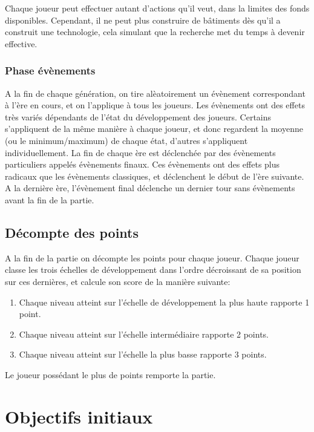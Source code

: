\documentclass[12pt,twoside,a4paper]{article}
\begin{document}
Chaque joueur peut effectuer autant d'actions qu'il veut, dans la limites des fonds disponibles. Cependant, il ne peut plus construire de b\^atiments d\`es qu'il a construit une technologie, cela simulant que la recherche met du temps \`a devenir effective.

\subsubsection{Phase \'ev\`enements}

A la fin de chaque g\'en\'eration, on tire al\`eatoirement un \'ev\`enement correspondant \`a l'\`ere en cours, et on l'applique \`a tous les joueurs. Les \'ev\`enements ont des effets tr\`es vari\'es d\'ependants de l'\'etat du d\'eveloppement des joueurs. Certains s'appliquent de la m\^eme mani\`ere \`a chaque joueur, et donc regardent la moyenne (ou le minimum/maximum) de chaque \'etat, d'autres s'appliquent individuellement.
La fin de chaque \`ere est d\'eclench\'ee par des \'ev\`enements particuliers appel\'es \'ev\`enements finaux. Ces \'ev\`enements ont des effets plus radicaux que les \'ev\`enements classiques, et d\'eclenchent le d\'ebut de l'\`ere suivante. A la derni\`ere \`ere, l'\'ev\`enement final d\'eclenche un dernier tour sans \'ev\`enements avant la fin de la partie.

\subsection{D\'ecompte des points}

A la fin de la partie on d\'ecompte les points pour chaque joueur. Chaque joueur classe les trois \'echelles de d\'eveloppement dans l'ordre d\'ecroissant de sa position sur ces derni\`eres, et calcule son score de la mani\`ere suivante:

\begin{enumerate}
\item Chaque niveau atteint sur l'\'echelle de d\'eveloppement la plus haute rapporte 1 point.
\item Chaque niveau atteint sur l'\'echelle interm\'ediaire rapporte 2 points.
\item Chaque niveau atteint sur l'\'echelle la plus basse rapporte 3 points.
\end{enumerate}

\noindent Le joueur poss\'edant le plus de points remporte la partie.


\section{Objectifs initiaux}
\end{document}
